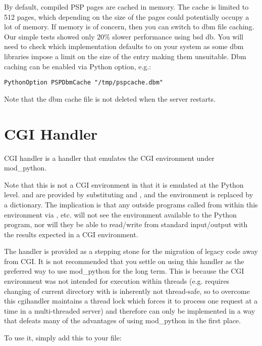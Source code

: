 By default, compiled PSP pages are cached in memory. The cache is
limited to 512 pages, which depending on the size of the pages could
potentially occupy a lot of memory. If memory is of concern, then you
can switch to dbm file caching. Our simple tests showed only 20\%
slower performance using bsd db. You will need to check which
implementation  defaults to on your system as some dbm
libraries impose a limit on the size of the entry making them
unsuitable. Dbm caching can be enabled via  Python
option, e.g.:

\begin{verbatim}
PythonOption PSPDbmCache "/tmp/pspcache.dbm"
\end{verbatim}
Note that the dbm cache file is not deleted when the server restarts.

\section{CGI Handler\label{hand-cgi}}


CGI handler is a handler that emulates the CGI environment under mod_python. 

Note that this is not a  CGI environment in that it is
emulated at the Python level.  and  are
provided by substituting  and , and
the environment is replaced by a dictionary. The implication is that
any outside programs called from within this environment via
, etc. will not see the environment available to the
Python program, nor will they be able to read/write from standard
input/output with the results expected in a  CGI environment.

The handler is provided as a stepping stone for the migration of
legacy code away from CGI. It is not recommended that you settle on
using this handler as the preferred way to use mod_python for the long
term. This is because the CGI environment was not intended for
execution within threads (e.g. requires changing of current directory
with is inherently not thread-safe, so to overcome this cgihandler
maintains a thread lock which forces it to process one request at a
time in a multi-threaded server) and therefore can only be implemented
in a way that defeats many of the advantages of using mod_python in
the first place.

To use it, simply add this to your  file: 

